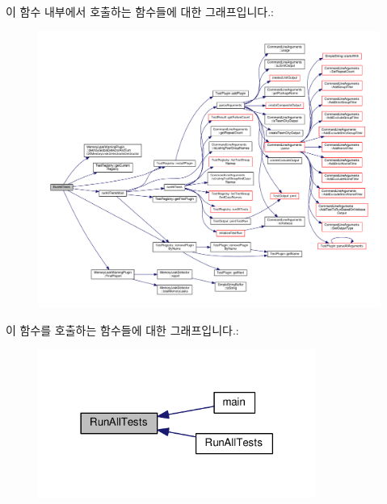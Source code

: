 이 함수 내부에서 호출하는 함수들에 대한 그래프입니다.\+:
\nopagebreak
\begin{figure}[H]
\begin{center}
\leavevmode
\includegraphics[width=350pt]{class_command_line_test_runner_a20babba9f8fa7e8e2bfa1283fc928b33_cgraph}
\end{center}
\end{figure}




이 함수를 호출하는 함수들에 대한 그래프입니다.\+:
\nopagebreak
\begin{figure}[H]
\begin{center}
\leavevmode
\includegraphics[width=258pt]{class_command_line_test_runner_a20babba9f8fa7e8e2bfa1283fc928b33_icgraph}
\end{center}
\end{figure}


